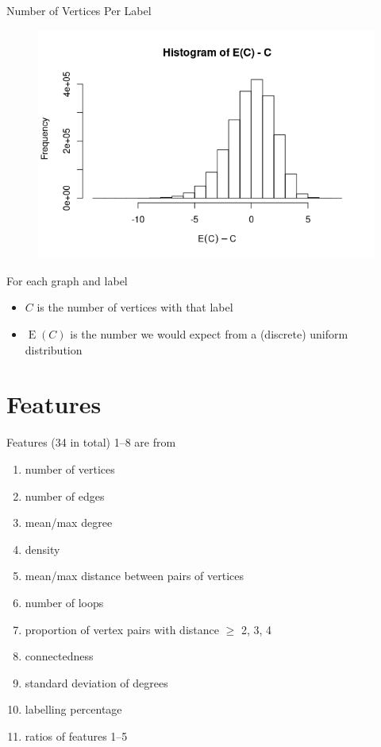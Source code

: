 \documentclass{beamer}
\DeclareMathOperator{\E}{E}
\begin{document}
\begin{frame}{Number of Vertices Per Label}
  \begin{figure}
    \centering
    \includegraphics[scale=0.4]{../dissertation/images/labelling_histogram.png}
  \end{figure}
  For each graph and label
  \begin{itemize}
  \item $C$ is the number of vertices with that label
  \item $\E(C)$ is the number we would expect from a (discrete) uniform distribution
  \end{itemize}
\end{frame}

\section{Features}

\begin{frame}{Features (34 in total)}
  1--8 are from \cite{DBLP:conf/lion/KotthoffMS16}
  \begin{enumerate}
  \item number of vertices
  \item number of edges
  \item mean/max degree
  \item density
  \item mean/max distance between pairs of vertices
  \item number of loops
  \item proportion of vertex pairs with distance $\ge$ 2, 3, 4
  \item connectedness
    \pause
  \item standard deviation of degrees
  \item labelling percentage
    \pause
  \item ratios of features 1--5
  \end{enumerate}
\end{frame}
\end{document}
